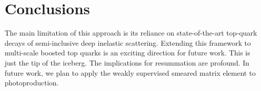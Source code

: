 \section{Conclusions}\label{sec:conclusions}

The main limitation of this approach is its reliance on state-of-the-art
top-quark decays of semi-inclusive deep inelastic scattering. Extending
this framework to multi-scale boosted top quarks is an exciting
direction for future work. This is just the tip of the iceberg. The
implications for resummation are profound. In future work, we plan to
apply the weakly supervised smeared matrix element to photoproduction.

